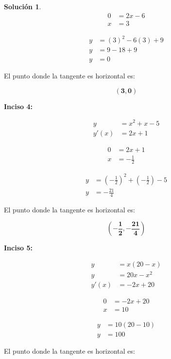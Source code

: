 \documentclass{article}
\theoremstyle{definition}
\newtheorem*{solution}{Solución}
\begin{document}
\begin{solution}
    \begin{align*}
        0 &= 2x-6 \\
        x &= 3
    \end{align*}

    \begin{align*}
        y &= (3)^2-6(3)+9 \\
        y &= 9-18+9 \\
        y &= 0
    \end{align*}

El punto donde la tangente es horizontal es:

    \[
        \mathbf{(3,0)}
    \]

\textbf{Inciso 4:}

    \begin{align*}
        y &= x^2+x-5 \\
        y'(x) &= 2x+1
    \end{align*}

    \begin{align*}
        0 &= 2x+1 \\
        x &= -\frac{1}{2}
    \end{align*}

    \begin{align*}
        y &= (-\frac{1}{2})^2+(-\frac{1}{2})-5 \\
        y &= -\frac{21}{4}
    \end{align*}

El punto donde la tangente es horizontal es:

    \[
        \mathbf{(-\frac{1}{2},-\frac{21}{4})}
    \]

\textbf{Inciso 5:}

    \begin{align*}
        y &= x(20-x) \\
        y &= 20x - x^2 \\
        y'(x) &= -2x+20
    \end{align*}

    \begin{align*}
        0 &= -2x + 20 \\
        x &= 10
    \end{align*}

    \begin{align*}
        y &= 10(20-10) \\
        y &= 100
    \end{align*}

El punto donde la tangente es horizontal es:


\end{solution}
\end{document}
